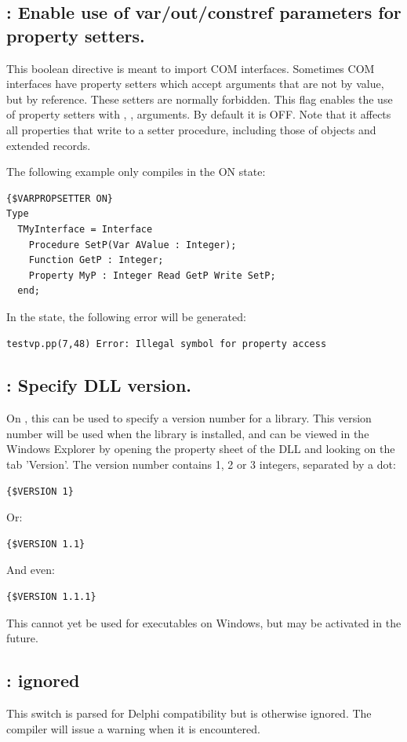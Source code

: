 \subsection{ : Enable use of var/out/constref
parameters for property setters.}
This boolean directive is meant to import COM interfaces. Sometimes COM
interfaces have property setters which accept arguments that are not by
value, but by reference. These setters are normally forbidden. This flag
enables the use of property setters with , , 
arguments. By default it is OFF. Note that it affects all properties that 
write to a setter procedure, including those of objects and extended records.

The following example only compiles in the ON state:
\begin{verbatim}
{$VARPROPSETTER ON}
Type
  TMyInterface = Interface
    Procedure SetP(Var AValue : Integer);
    Function GetP : Integer;
    Property MyP : Integer Read GetP Write SetP;
  end;
\end{verbatim}
In the  state, the following error will be generated:
\begin{verbatim}
testvp.pp(7,48) Error: Illegal symbol for property access
\end{verbatim}

\subsection{ : Specify DLL version.}
On \windows, this can be used to specify a version number for a library.
This version number will be used when the library is installed, and can be
viewed in the Windows Explorer by opening the property sheet of the DLL and
looking on the tab 'Version'. 
The version number contains 1, 2 or 3 integers, separated by a dot:
\begin{verbatim}
{$VERSION 1}
\end{verbatim}
Or:
\begin{verbatim}
{$VERSION 1.1}
\end{verbatim}
And even:
\begin{verbatim}
{$VERSION 1.1.1}
\end{verbatim}
This cannot yet be used for executables on Windows, but may be activated in
the future.

\subsection{ : ignored}
This switch is parsed for Delphi compatibility but is otherwise ignored. 
The compiler will issue a warning when it is encountered.


